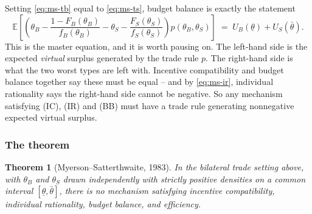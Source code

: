 \documentclass[12pt]{article}
\newcommand{\bbE}{\mathbb{E}}
\newtheorem{theorem}{Theorem}
\theoremstyle{definition}
\theoremstyle{remark}
\theoremstyle{plain}                          %
\newcommand{\lo}{\underline{\theta}}
\newcommand{\hi}{\bar{\theta}}
\begin{document}
Setting \eqref{eq:ms-tb} equal to \eqref{eq:ms-ts}, budget balance is exactly the statement
\begin{equation}\label{eq:ms-master}
    \bbE\!\left[\left(\theta_B - \frac{1-F_B(\theta_B)}{f_B(\theta_B)} - \theta_S - \frac{F_S(\theta_S)}{f_S(\theta_S)}\right) p(\theta_B,\theta_S)\right]
    \;=\; U_B(\lo) + U_S(\hi).
\end{equation}
This is the master equation, and it is worth pausing on. The left-hand side is the expected \emph{virtual} surplus generated by the trade rule $p$. The right-hand side is what the two worst types are left with. Incentive compatibility and budget balance together say these must be equal -- and by \eqref{eq:ms-ir}, individual rationality says the right-hand side cannot be negative. So any mechanism satisfying (IC), (IR) and (BB) must have a trade rule generating nonnegative expected virtual surplus.
 
\subsubsection{The theorem}
 
\begin{theorem}[Myerson--Satterthwaite, 1983]\label{thm:ms}
In the bilateral trade setting above, with $\theta_B$ and $\theta_S$ drawn independently with strictly positive densities on a common interval $[\lo,\hi]$, there is no mechanism satisfying incentive compatibility, individual rationality, budget balance, and efficiency.
\end{theorem}
 
\end{document}
